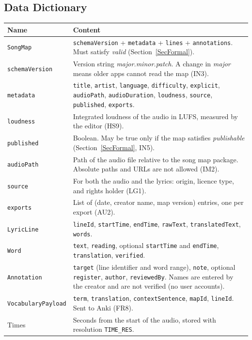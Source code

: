 \documentclass[12pt]{article}
\newcommand{\cn}[1]{\texttt{#1}}
\begin{document}
\subsection{Data Dictionary}
\begin{longtable}{@{}P{0.26\textwidth}P{0.69\textwidth}@{}}
\toprule
\textbf{Name} & \textbf{Content}\\
\midrule
\endhead
\texttt{SongMap} & \texttt{schemaVersion} + \texttt{metadata} +
\texttt{lines} + \texttt{annotations}. Must satisfy \textit{valid}
(Section~\ref{SecFormal}).\\
\texttt{schemaVersion} & Version string \textit{major.minor.patch}. A change
in \textit{major} means older apps cannot read the map (IN3).\\
\texttt{metadata} & \texttt{title}, \texttt{artist}, \texttt{language},
\texttt{difficulty}, \texttt{explicit}, \texttt{audioPath},
\texttt{audioDuration}, \texttt{loudness}, \texttt{source},
\texttt{published}, \texttt{exports}.\\
\texttt{loudness} & Integrated loudness of the audio in LUFS, measured by the
editor (HS9).\\
\texttt{published} & Boolean. May be true only if the map satisfies
\textit{publishable} (Section~\ref{SecFormal}, IN5).\\
\texttt{audioPath} & Path of the audio file relative to the song map package.
Absolute paths and URLs are not allowed (IM2).\\
\texttt{source} & For both the audio and the lyrics: origin, licence type,
and rights holder (LG1).\\
\texttt{exports} & List of (date, creator name, map version) entries, one per
export (AU2).\\
\texttt{LyricLine} & \texttt{lineId}, \texttt{startTime}, \texttt{endTime},
\texttt{rawText}, \texttt{translatedText}, \texttt{words}.\\
\texttt{Word} & \texttt{text}, \texttt{reading}, optional
\texttt{startTime} and \texttt{endTime}, \texttt{translation},
\texttt{verified}.\\
\texttt{Annotation} & \texttt{target} (line identifier and word range),
\texttt{note}, optional \texttt{register}, \texttt{author},
\texttt{reviewedBy}. Names are entered by the creator and are not verified
(no user accounts).\\
\texttt{VocabularyPayload} & \texttt{term}, \texttt{translation},
\texttt{contextSentence}, \texttt{mapId}, \texttt{lineId}. Sent to Anki
(FR8).\\
Times & Seconds from the start of the audio, stored with resolution
\cn{TIME\_RES}.\\
\bottomrule
\end{longtable}
\end{document}
